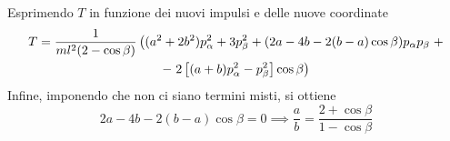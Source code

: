 \documentclass{article}
\begin{document}
Esprimendo $T$ in funzione dei nuovi impulsi e delle nuove coordinate
\begin{gather}
    T = \frac{1}{ml^2(2 - \cos \beta)}\left((a^2 + 2b^2)p_\alpha^2 + 3p_\beta^2 + (2a - 4b - 2(b - a)\cos \beta)p_\alpha p_\beta \right. +\notag \\
    - \left. 2\left[(a + b)p_\alpha^2 - p_\beta^2\right]\cos \beta\right) \notag
\end{gather}
Infine, imponendo che non ci siano termini misti, si ottiene
\begin{equation}
    2a - 4b - 2(b - a)\cos \beta = 0 \implies \frac{a}{b} = \frac{2 + \cos \beta}{1 - \cos \beta} \tag{8.3.6}
\end{equation}
\end{document}
